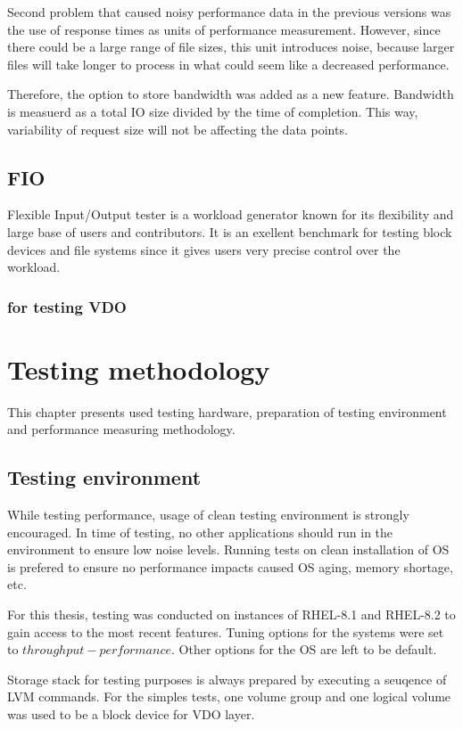 \documentclass[
  color, %
  table, %
  lof,   %
  lot,   %
]{fithesis3}
\begin{document}
Second problem that caused noisy performance data in the previous versions was the use of response times as units of performance measurement. However, since there could be a large range of file sizes, this unit introduces noise, because larger files will take longer to process in what could seem like a decreased performance.

Therefore, the option to store bandwidth was added as a new feature. Bandwidth is measuerd as a total IO size divided by the time of completion. This way, variability of request size will not be affecting the data points.



\section{FIO}
Flexible Input/Output tester is a workload generator known for its flexibility and large base of users and contributors. It is an exellent benchmark for testing block devices and file systems since it gives users very precise control over the workload.

\subsection{for testing VDO}


\chapter{Testing methodology}
This chapter presents used testing hardware, preparation of testing environment and performance measuring methodology.


\section{Testing environment}
While testing performance, usage of clean testing environment is strongly encouraged. In time of testing, no other applications should run in the environment to ensure low noise levels. Running tests on clean installation of OS is prefered to ensure no performance impacts caused OS aging, memory shortage, etc.

For this thesis, testing was conducted on instances of RHEL-8.1 and RHEL-8.2 to gain access to the most recent features. Tuning options for the systems were set to $throughput-performance$. Other options for the OS are left to be default.

Storage stack for testing purposes is always prepared by executing a seuqence of LVM commands. For the simples tests, one volume group and one logical volume was used to be a block device for VDO layer.
\end{document}
